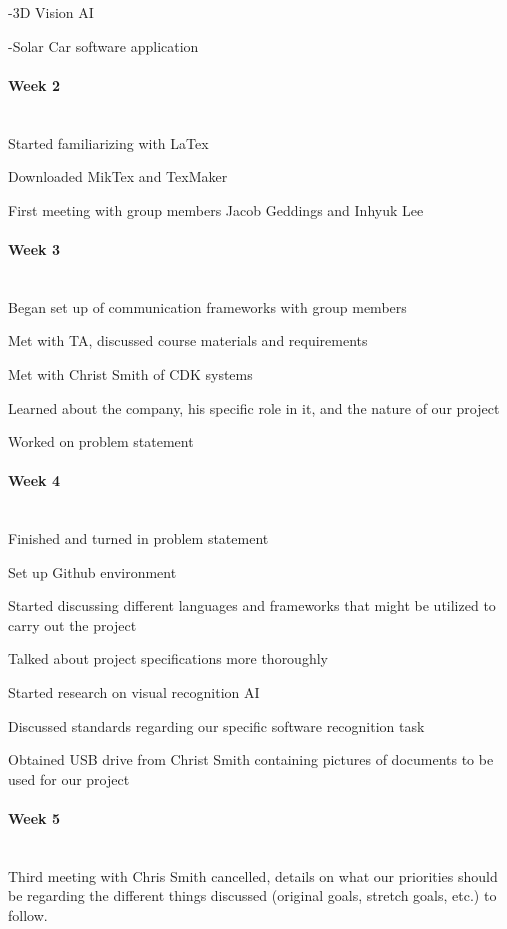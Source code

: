 \documentclass[article, onecolumn, draftclsnofoot,10pt, compsoc]{IEEEtran}
\begin{document}
-3D Vision AI 

-Solar Car software application 

\paragraph{Week 2}
\mbox{}\\
Started familiarizing with LaTex 

Downloaded MikTex and TexMaker   

First meeting with group members Jacob Geddings and Inhyuk Lee 

\paragraph{Week 3}
\mbox{}\\
Began set up of communication frameworks with group members 

Met with TA, discussed course materials and requirements 

Met with Christ Smith of CDK systems 

Learned about the company, his specific role in it, and the nature of our project 

Worked on problem statement 

\paragraph{Week 4}
\mbox{}\\
Finished and turned in problem statement 

Set up Github environment 

Started discussing different languages and frameworks that might be utilized to carry out the project 

Talked about project specifications more thoroughly 

Started research on visual recognition AI 

Discussed standards regarding our specific software recognition task 

Obtained USB drive from Christ Smith containing pictures of documents to be used for our project

\paragraph{Week 5}
\mbox{}\\
Third meeting with Chris Smith cancelled, details on what our priorities should be regarding the different things discussed (original goals, stretch goals, etc.) to follow. 
\end{document}

